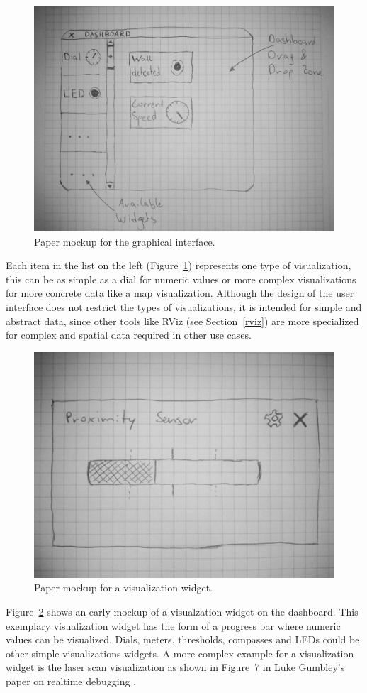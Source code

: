 \begin{figure}[htbp]
  \centering
  \includegraphics[width=\textwidth]{img/initial_gui_mockup.jpg}
  \caption{Paper mockup for the graphical interface.}
  \label{gui_mockup}
\end{figure}

Each item in the list on the left (Figure~\ref{gui_mockup}) represents one type of visualization, this can be as simple as a dial for numeric values or more complex visualizations for more concrete data like a map visualization. Although the design of the user interface does not restrict the types of visualizations, it is intended for simple and abstract data, since other tools like RViz (see Section~\ref{rviz}) are more specialized for complex and spatial data required in other use cases.

\begin{figure}[htbp]
  \centering
  \includegraphics[width=.5\textwidth]{img/initial_widget_mockup.jpg}
  \caption{Paper mockup for a visualization widget.}
  \label{widget_mockup}
\end{figure}

Figure~\ref{widget_mockup} shows an early mockup of a visualzation widget on the dashboard. This exemplary visualization widget has the form of a progress bar where numeric values can be visualized. Dials, meters, thresholds, compasses and LEDs could be other simple visualizations widgets. A more complex example for a visualization widget is the laser scan visualization as shown in Figure~7 in Luke Gumbley's paper on realtime debugging \cite{Gumbley2009}.

